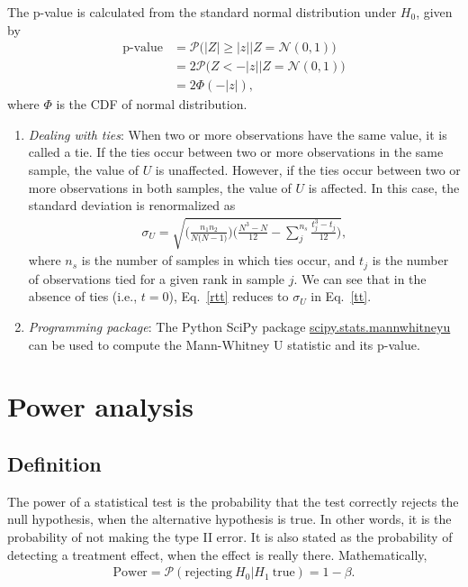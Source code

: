 \documentclass[10pt, aps,twocolumn, superscriptaddress, nofootinbib]{revtex4-2}
\begin{document}
The p-value  is calculated from the standard normal distribution under $H_0$, given by
\begin{align}
	\text{p-value} &= \mathcal{P}\Big(|Z|\geq |z|\Big\vert Z = \mathcal{N}(0,1)\Big)\nonumber\\&
	= 2\mathcal{P}\Big(Z< -|z|\Big\vert Z = \mathcal{N}(0,1)\Big) \nonumber\\&
	= 2\Phi(-|z|),
\end{align}
where $\Phi$ is the CDF of normal distribution.
\begin{enumerate}	
\item{\it Dealing with ties}: When two or more observations have the same value, it is called a tie. If the ties occur between  two or more observations in the same sample, the value of $U$ is unaffected. However, if the ties occur between  two or more observations in both  samples, the value of $U$ is affected. In this case, the standard deviation is renormalized as
\begin{align}
 \sigma_U =\sqrt{\Big(  \frac{n_1n_2}{N\big(N-1\big)}\Big)\Big(  \frac{N^3 -N}{12} - \sum_{j}^{n_s}\frac{t_j^3-t_j}{12}\Big) },
 \label{rtt}
\end{align}
where $n_s$ is the number of samples in which ties occur, and $t_j$ is the number of observations tied for a given rank in sample $j$. We can see that in the absence of ties (i.e., $t =0$), Eq.~\eqref{rtt} reduces to $\sigma_U$ in Eq.~\eqref{tt}.

\item{\it Programming package}: The  Python SciPy package \href{https://docs.scipy.org/doc/scipy/reference/generated/scipy.stats.mannwhitneyu.html}{scipy.stats.mannwhitneyu} can be used  to compute the Mann-Whitney U statistic and its p-value.
\end{enumerate}		
 
\section{Power analysis}
\subsection{Definition}
The power of a statistical test is the probability that the test correctly rejects the null hypothesis, when the alternative  hypothesis is true. In other words, it is the probability of not making the type II error.  It is also stated as the probability of detecting a treatment effect, when the effect is really there. Mathematically, 
\begin{align}
	\text {Power} =  \mathcal{P}(\text{rejecting}~H_0| H_1~\text{true})= 1-\beta.
\end{align}
\end{document}
